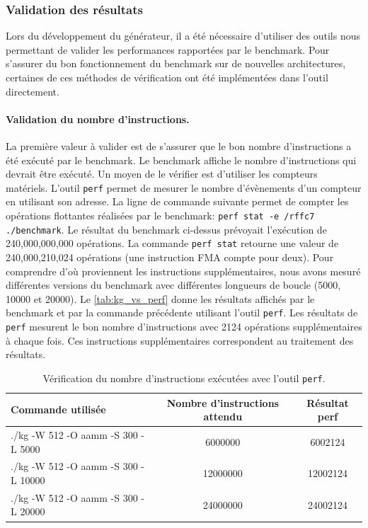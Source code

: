   
    
    
    \subsubsection{Validation des résultats}
    
        Lors du développement du générateur, il a été nécessaire d'utiliser des outils nous permettant de valider les performances rapportées par le benchmark. Pour s'assurer du bon fonctionnement du benchmark sur de nouvelles architectures, certaines de ces méthodes de vérification ont été implémentées dans l'outil directement. 
        
        \paragraph{Validation du nombre d'instructions.} 
            
            La première valeur à valider est de s'assurer que le bon nombre d'instructions a été exécuté par le benchmark. Le benchmark affiche le nombre d'instructions qui devrait être exécuté. Un moyen de le vérifier est d'utiliser les compteurs matériels. L'outil \verb|perf| permet de mesurer le nombre d'évènements d'un compteur en utilisant son adresse. La ligne de commande suivante permet de compter les opérations flottantes réalisées par le benchmark: \verb|perf stat -e /rffc7 ./benchmark|. Le résultat du benchmark ci-dessus prévoyait l'exécution de 240,000,000,000 opérations. La commande \verb|perf stat| retourne une valeur de 240,000,210,024 opérations (une instruction FMA compte pour deux). Pour comprendre d'où proviennent les instructions supplémentaires, nous avons mesuré différentes versions du benchmark avec différentes longueurs de boucle (5000, 10000 et 20000). Le \autoref{tab:kg_vs_perf} donne les résultats affichés par le benchmark et par la commande précédente utilisant l'outil \verb|perf|. Les résultats de \verb|perf| mesurent le bon nombre d'instructions avec 2124 opérations supplémentaires à chaque fois. Ces instructions supplémentaires correspondent au traitement des résultats.
    
            \begin{table}[h!]
            \centering
            \begin{tabular}{@{}lcc@{}}
            \toprule
             Commande utilisée & Nombre d'instructions attendu & Résultat perf \\ \midrule
            ./kg -W 512 -O aamm -S 300 -L 5000 & 6000000 & 6002124 \\
            ./kg -W 512 -O aamm -S 300 -L 10000 & 12000000 & 12002124 \\
            ./kg -W 512 -O aamm -S 300 -L 20000 & 24000000 & 24002124 \\ \bottomrule
            \end{tabular}%
            \caption{Vérification du nombre d'instructions exécutées avec l'outil \texttt{perf}.}
            \label{tab:kg_vs_perf}
            \end{table}
        
